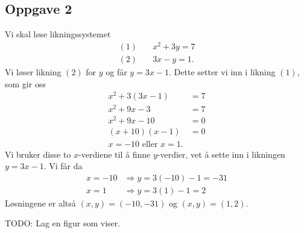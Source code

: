 \subsection*{Oppgave 2}
Vi skal løse likningssystemet
\begin{align*}
	(1) \quad & x^2 + 3y = 7 \\	
	(2) \quad & 3x - y = 1.
\end{align*}
Vi løser likning $(2)$ for $y$ og får $y = 3x - 1$.
Dette setter vi inn i likning $(1)$, som gir oss
\begin{align*}
	x^2 + 3 \left( 3x - 1\right) &= 7 \\
	x^2 + 9x - 3 &= 7 \\
	x^2 + 9x - 10 &= 0 \\
	(x + 10)(x - 1) &= 0 \\
	x = -10 \text{ eller } x = 1.
\end{align*}
Vi bruker disse to $x$-verdiene til å finne $y$-verdier, vet å sette inn i likningen $y = 3x - 1$. Vi får da
\begin{align*}
	x = -10 & \Rightarrow y = 3(-10) - 1 = -31 \\
	x = 1 \quad \ & \Rightarrow y = 3(1) - 1 = 2
\end{align*}
Løsningene er altså $(x, y) = (-10, -31)$ og $(x, y) = (1, 2)$.


TODO: Lag en figur som viser.

